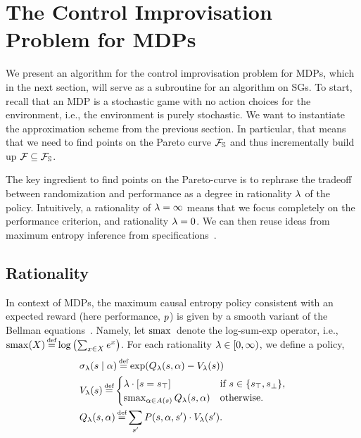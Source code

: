 \section{The Control Improvisation Problem for MDPs}
\label{sec:mdps}

We present an algorithm for the control improvisation problem for
MDPs, which in the next section, will serve as a subroutine for an algorithm
on SGs. To start, recall that an MDP is a stochastic game with no action choices for the environment, i.e., the environment is purely stochastic. 
We want to instantiate the approximation scheme from the previous section. In particular, that means that we need to find points on the Pareto curve $\mathcal{F}_{\mathbb{S}}$ and thus incrementally build up $\mathcal{F}_{} \subseteq \mathcal{F}_{\mathbb{S}}$. 

The
key ingredient to find points on the Pareto-curve is to rephrase the tradeoff between randomization and
performance as a degree in rationality $\lambda$ of the
policy. Intuitively, a rationality of $\lambda = \infty$ means that we
focus completely on the performance criterion, and rationality $\lambda =
0$. We can then reuse ideas from maximum entropy inference from
specifications~\cite{DBLP:conf/cav/Vazquez-Chanlatte20}.

\subsection{Rationality}

\noindent
In context of MDPs, the maximum causal entropy policy consistent with
an expected reward (here performance, $p$) is given by a
smooth variant of the Bellman equations~\cite{mceThesis}. Namely, let
$\operatorname*{\mathrm{smax}}{}$ denote the log-sum-exp operator, i.e., $\smoothmax(X)
\eqdef \log \left( \sum_{x\in X} e^x \right)$. For each rationality
$\lambda \in [0, \infty)$, we define a policy,
 \begin{align}
   &\sched_\rat(s\mid \act) \eqdef \exp( Q_\rat(s,\act) - V_\rat(s))  \\
   & V_\rat(s) \eqdef  \begin{cases}
     \lambda  \cdot \indicator{s = \target} & \text{if }s \in \{ \target, \sink \},\\
     \smoothmax_{\act \in \EnAct(s)}{  Q_\rat(s,\act) } & \text{otherwise.}
   \end{cases}\label{eq:mdp:v}\\ 
	& Q_\rat(s, \act) \eqdef \sum_{s'} P(s,\act,s') \cdot V_\rat(s').
 \end{align}

